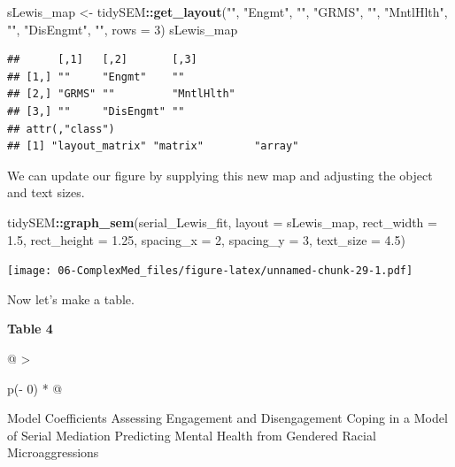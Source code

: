 \documentclass[
  11pt,
]{book}
\newenvironment{Shaded}{\begin{snugshade}}{\end{snugshade}}
\newcommand{\AttributeTok}[1]{\textcolor[rgb]{0.27,0.27,0.27}{#1}}
\newcommand{\DecValTok}[1]{\textcolor[rgb]{0.06,0.06,0.06}{#1}}
\newcommand{\FloatTok}[1]{\textcolor[rgb]{0.06,0.06,0.06}{#1}}
\newcommand{\FunctionTok}[1]{\textcolor[rgb]{0.27,0.27,0.27}{\textbf{#1}}}
\newcommand{\NormalTok}[1]{#1}
\newcommand{\OtherTok}[1]{\textcolor[rgb]{0.37,0.37,0.37}{#1}}
\newcommand{\SpecialCharTok}[1]{\textcolor[rgb]{0.43,0.43,0.43}{\textbf{#1}}}
\newcommand{\StringTok}[1]{\textcolor[rgb]{0.5,0.5,0.5}{#1}}
\begin{document}
\begin{Shaded}
\begin{Highlighting}[]
\NormalTok{sLewis\_map }\OtherTok{\textless{}{-}}\NormalTok{ tidySEM}\SpecialCharTok{::}\FunctionTok{get\_layout}\NormalTok{(}\StringTok{""}\NormalTok{, }\StringTok{"Engmt"}\NormalTok{, }\StringTok{""}\NormalTok{, }\StringTok{"GRMS"}\NormalTok{, }\StringTok{""}\NormalTok{, }\StringTok{"MntlHlth"}\NormalTok{,}
    \StringTok{""}\NormalTok{, }\StringTok{"DisEngmt"}\NormalTok{, }\StringTok{""}\NormalTok{, }\AttributeTok{rows =} \DecValTok{3}\NormalTok{)}
\NormalTok{sLewis\_map}
\end{Highlighting}
\end{Shaded}

\begin{verbatim}
##      [,1]   [,2]       [,3]      
## [1,] ""     "Engmt"    ""        
## [2,] "GRMS" ""         "MntlHlth"
## [3,] ""     "DisEngmt" ""        
## attr(,"class")
## [1] "layout_matrix" "matrix"        "array"
\end{verbatim}

We can update our figure by supplying this new map and adjusting the object and text sizes.

\begin{Shaded}
\begin{Highlighting}[]
\NormalTok{tidySEM}\SpecialCharTok{::}\FunctionTok{graph\_sem}\NormalTok{(serial\_Lewis\_fit, }\AttributeTok{layout =}\NormalTok{ sLewis\_map, }\AttributeTok{rect\_width =} \FloatTok{1.5}\NormalTok{,}
    \AttributeTok{rect\_height =} \FloatTok{1.25}\NormalTok{, }\AttributeTok{spacing\_x =} \DecValTok{2}\NormalTok{, }\AttributeTok{spacing\_y =} \DecValTok{3}\NormalTok{, }\AttributeTok{text\_size =} \FloatTok{4.5}\NormalTok{)}
\end{Highlighting}
\end{Shaded}

\texttt{[image: 06-ComplexMed\_files/figure-latex/unnamed-chunk-29-1.pdf]}

Now let's make a table.

\textbf{Table 4 }

\begin{longtable}[]{@{}
  >{\raggedright\arraybackslash}p{(\columnwidth - 0\tabcolsep) * }@{}}
\toprule\noalign{}
\begin{minipage}[b]{\linewidth}\raggedright
Model Coefficients Assessing Engagement and Disengagement Coping in a Model of Serial Mediation Predicting Mental Health from Gendered Racial Microaggressions
\end{minipage} \\
\midrule\noalign{}
\endhead
\bottomrule\noalign{}
\endlastfoot
\end{longtable}
\end{document}
